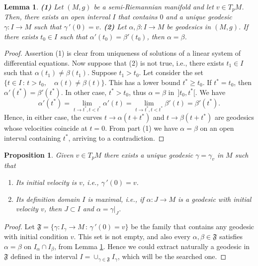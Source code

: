 \documentclass[11pt]{book}
\newtheorem{pro}[defi]{Proposition}
\newtheorem{lem}[defi]{Lemma}
\def\F{\mathfrak F}
\begin{document}
\begin{lem}\label{geodesica}
	{\bf (1)} Let $(M,g)$ be a semi-Riemannian manifold and let $v\in T_pM$. Then, there exists an open interval $I$ that contains $0$ and a unique geodesic $\gamma:I\to M$ such that $\gamma{\,'}(0)=v$.
	{\bf (2)} Let $\alpha,\beta:I\to M$ be geodesics in $(M,g)$. If there exists $t_0\in I$ such that $\alpha'(t_0)=\beta'(t_0)$, then $\alpha=\beta$.
\end{lem}
\begin{proof}
	Assertion (1) is clear from uniqueness of solutions of a linear system of differential equations. Now suppose that (2) is not true, i.e., there exists $t_1\in I$ such that $\alpha(t_1) \ne \beta(t_1)$. Suppose $t_1>t_0$. 
	Let consider the set $\{t\in I \, : \, t>t_0, \quad \alpha(t)\ne \beta(t)\} $. This has a lower bound $t^*\ge t_0$. If $t^*=t_0$, then $\alpha'(t^*)=\beta'(t^*)$. In other case, $t^*>t_0$, thus $\alpha=\beta$ in $\, ]t_0,t^*[$. We have
	\[
	\alpha'(t^*)=\lim_{t\to t^*, t<t^*} \alpha'(t)=\lim_{t\to t^*, t<t^*} \beta'(t)=\beta'(t^*).
	\]
	Hence, in either case, the curves $t\to \alpha(t+t^*)$ and $t\to \beta(t+t^*)$ are geodesics whose velocities coincide at $t=0$. From part (1) we have $\alpha=\beta$ on an open interval containing $t^*$, arriving to a contradiction. 
\end{proof}

\begin{pro}
	Given $v\in T_pM$ there exists a unique geodesic $\gamma=\gamma_v$ in $M$ such that
	\begin{enumerate}
		\item Its initial velocity is $v$, i.e., $\gamma{\,'}(0)=v$.
		\item Its definition domain $I$ is maximal, i.e., if $\alpha:J\to M$ is a geodesic with initial velocity $v$, then $J\subset I$ and $\alpha=\gamma|_J$.
	\end{enumerate}
\end{pro}
\begin{proof}
	Let $\F=\{ \gamma :I_\gamma \to M \, : \, \gamma{\,'}(0)=v\}$ be the family that contains any geodesic with initial condition $v$. This set is not empty, and also every $\alpha,\beta\in \F$ satisfies $\alpha=\beta$ on $I_\alpha \cap I_\beta$, from Lemma \ref{geodesica}. Hence we could extract naturally a geodesic in $\F$ defined in the interval $I=\cup_{\gamma \in \F} I_\gamma$, which will be the searched one.	
\end{proof}
\end{document}
